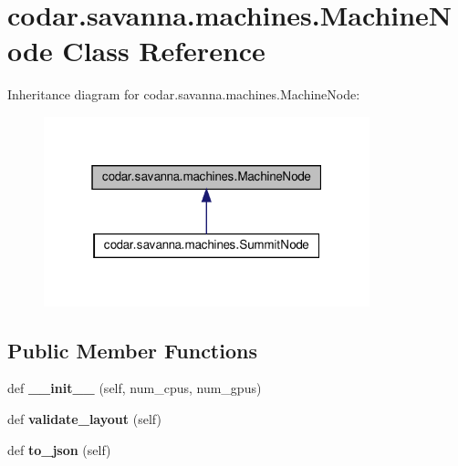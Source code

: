 \hypertarget{classcodar_1_1savanna_1_1machines_1_1_machine_node}{}\section{codar.\+savanna.\+machines.\+Machine\+Node Class Reference}
\label{classcodar_1_1savanna_1_1machines_1_1_machine_node}


Inheritance diagram for codar.\+savanna.\+machines.\+Machine\+Node\+:
\nopagebreak
\begin{figure}[H]
\begin{center}
\leavevmode
\includegraphics[width=268pt]{classcodar_1_1savanna_1_1machines_1_1_machine_node__inherit__graph}
\end{center}
\end{figure}
\subsection*{Public Member Functions}
\begin{DoxyCompactItemize}
\item 
\mbox{\label{classcodar_1_1savanna_1_1machines_1_1_machine_node_adc12f9810d54e9f497a4df2c3ab80577}} 
def {\bfseries \+\_\+\+\_\+init\+\_\+\+\_\+} (self, num\+\_\+cpus, num\+\_\+gpus)
\item 
\mbox{\label{classcodar_1_1savanna_1_1machines_1_1_machine_node_a32ee6eb242c8dff720e89ffbd772cf40}} 
def {\bfseries validate\+\_\+layout} (self)
\item 
\mbox{\label{classcodar_1_1savanna_1_1machines_1_1_machine_node_a9598980dfb90152c1f2091fae5dd1299}} 
def {\bfseries to\+\_\+json} (self)
\end{DoxyCompactItemize}
